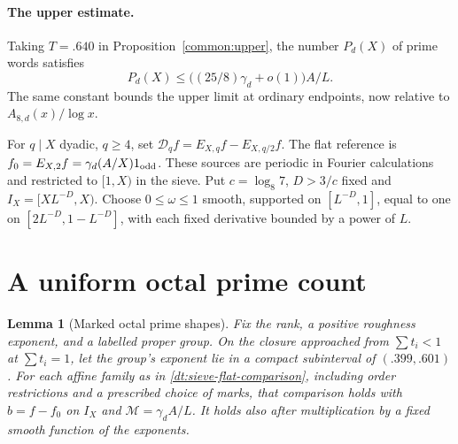 \documentclass[11pt,a4paper]{article}
\theoremstyle{paperplain}
\newtheorem{lemma}[theorem]{Lemma}
\numberwithin{equation}{section}
\begin{document}
\paragraph{The upper estimate.}\label{sec:upper-all}
Taking $T=.640$ in Proposition~\ref{common:upper}, the number
$P_d(X)$ of prime words satisfies
\begin{equation}\label{octal:word-upper}
 P_d(X)\le \bigl((25/8)\gamma_d+o(1)\bigr) A/L .
\end{equation}
The same constant bounds the upper limit at ordinary endpoints,
now relative to $A_{8,d}(x)/\log x$.

For $q\mid X$ dyadic, $q\ge4$, set
$\mathcal D_q f=E_{X,q}f-E_{X,q/2}f$.
The flat reference is $f_0=E_{X,2}f=\gamma_d(A/X)1_{\rm odd}$.
These sources are periodic in Fourier calculations and restricted to
$[1,X)$ in the sieve. Put $c=\log_8 7$, $D>3/c$ fixed and
$I_X=[XL^{-D},X)$. Choose $0\le\omega\le1$ smooth, supported on
$[L^{-D},1]$, equal to one on $[2L^{-D},1-L^{-D}]$, with each fixed
derivative bounded by a power of $L$.

\section{A uniform octal prime count}
\label{sec:octal-prime-count}

\begin{lemma}[Marked octal prime shapes]\label{octal:balanced-shape-comparison}
Fix the rank, a positive roughness exponent, and a labelled proper group.
On the closure approached from $\sum t_i<1$ at $\sum t_i=1$, let the group's exponent lie in a compact
subinterval of $(.399,.601)$. For each affine family as in
\eqref{dt:sieve-flat-comparison}, including order restrictions and a
prescribed choice of marks, that comparison holds with $b=f-f_0$ on
$I_X$ and $\mathcal M=\gamma_d A/L$. It holds also after multiplication
by a fixed smooth function of the exponents.
\end{lemma}
\end{document}
